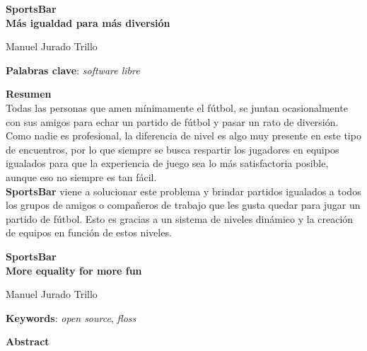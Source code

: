 \thispagestyle{empty}

\begin{center}
{\large\bfseries SportsBar \\ Más igualdad para más diversión }\\
\end{center}
\begin{center}
Manuel Jurado Trillo\\
\end{center}


\vspace{0.5cm}
\noindent\textbf{Palabras clave}: \textit{software libre}
\vspace{0.7cm}

\noindent\textbf{Resumen}\\

Todas las personas que amen mínimamente el fútbol, se juntan ocasionalmente con sus amigos para echar un partido de fútbol y pasar un rato de diversión.
Como nadie es profesional, la diferencia de nivel es algo muy presente en este tipo de encuentros, por lo que siempre se busca respartir los jugadores en equipos igualados
para que la experiencia de juego sea lo más satisfactoria posible, aunque eso no siempre es tan fácil.\\

\textbf{SportsBar} viene a solucionar este problema y brindar partidos igualados a todos los grupos de amigos o compañeros de trabajo que les gusta quedar para jugar un partido de fútbol.
Esto es gracias a un sistema de niveles dinámico y la creación de equipos en función de estos niveles.

	

\cleardoublepage

\begin{center}
	{\large\bfseries SportsBar \\ More equality for more fun}\\
\end{center}
\begin{center}
	Manuel Jurado Trillo\\
\end{center}
\vspace{0.5cm}
\noindent\textbf{Keywords}: \textit{open source}, \textit{floss}
\vspace{0.7cm}

\noindent\textbf{Abstract}\\

